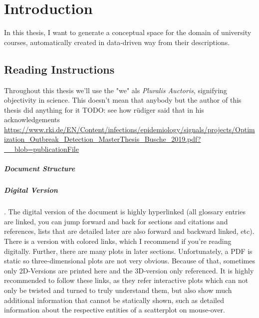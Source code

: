 \chapter{Introduction}

In this thesis, I want to generate a conceptual space for the domain of university courses, automatically created in data-driven way from their descriptions.

\section{Reading Instructions}

Throughout this thesis we'll use the "we" als \emph{Pluralis Auctoris}, signifying objectivity in science. This doesn't mean that anybody but the author of this thesis did anything for it TODO: see how rüdiger said that in his acknowledgements \url{https://www.rki.de/EN/Content/infections/epidemiology/signals/projects/Optimization_Outbreak_Detection_MasterThesis_Busche_2019.pdf?__blob=publicationFile}

\paragraph*{Document Structure}

\paragraph*{Digital Version}

. The digital version of the document is highly hyperlinked (all glossary entries are linked, you can jump forward and back for sections and citations and references, lists that are detailed later are also forward and backward linked, etc). There is a version with colored links, which I recommend if you're reading digitally. Further, there are many plots in later sections. Unfortunately, a PDF is static so three-dimensional plots are not very obvious. Because of that, sometimes only 2D-Versions are printed here and the 3D-version only referenced. It is highly recommended to follow these links, as they refer interactive plots which can not only be twisted and turned to truly understand them, but also show much additional information that cannot be statically shown, such as detailed information about the respective entities of a scatterplot on mouse-over.



